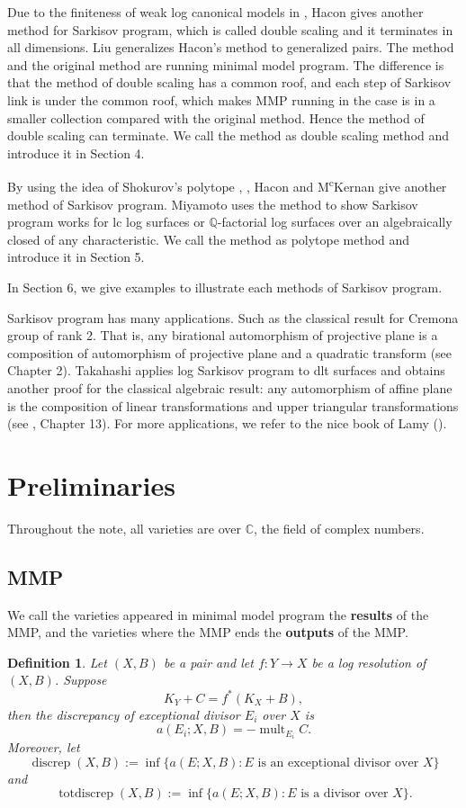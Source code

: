 \documentclass[11pt]{amsart}
\newtheorem{defn}{Definition}[section]
\begin{document}
Due to the finiteness of weak log canonical models in \cite{BCHM10}, Hacon \cite{haconMinimalModelProgram2012} gives another method for Sarkisov program, which is called  double scaling  and it terminates in all dimensions. 
Liu \cite{liuSarkisovProgramGeneralized2021} generalizes Hacon's method to generalized pairs. The method and the original method are running minimal model program. The difference is that the method of double scaling has a common roof, and each step of Sarkisov link is under the common roof, which makes MMP running in the case is in a smaller collection  compared with the original method. Hence the method of double scaling can terminate. We  call the method as double scaling method and introduce it in Section 4.


By using the idea of Shokurov's polytope \cite{Sho96}, \cite{cs11}, Hacon and M\textsuperscript{c}Kernan \cite{haconSarkisovProgram2012} give another method of Sarkisov program. Miyamoto \cite{miyamoto2019TheSP} uses the method to show Sarkisov program works for  lc log surfaces or $\mathbb{Q}$-factorial log surfaces over an algebraically closed of any characteristic.  We call the method as polytope method and introduce it in Section 5.

In Section 6, we give examples to illustrate each methods of Sarkisov program.

Sarkisov program has many applications. Such as the classical result for Cremona group of rank 2. That is, any birational automorphism of projective plane is a composition of automorphism of projective plane and a quadratic transform (see \cite{ksc04} Chapter 2). Takahashi \cite{tak95} applies log Sarkisov program to dlt surfaces and obtains another proof for the classical algebraic result: any automorphism of affine plane is the composition of linear transformations and upper triangular transformations (see \cite{mat02}, Chapter 13). For more applications, we refer to the nice book of Lamy (\cite{lam22}). 


\section{Preliminaries}
Throughout the note, all varieties are over $\mathbb{C}$, the field of complex numbers.
\subsection{MMP}
We call the varieties appeared in minimal model program the \textbf{results} of the MMP, and the varieties where the MMP ends  the \textbf{outputs} of the MMP.
\begin{defn}
  Let $(X,B)$ be a pair  and let  $f:Y\to X$ be a log resolution of $(X,B)$. Suppose
  \[
  K_{Y}+C=f^*(K_{X}+B)
  ,\]
then the discrepancy  of exceptional divisor $E_{i}$ over $X$ is
\[
  a(E_{i};X,B)=-\operatorname{mult}_{E_{i}}C
.\]
 Moreover, let
\[
  \operatorname{discrep}(X, B) := \operatorname{inf}\{a(E; X, B) : E \text{ is an exceptional divisor over } X \}
\]
and
\[
  \operatorname{totdiscrep}(X, B) :=\operatorname{inf}\{a(E; X, B) : E \text{ is a divisor over } X\}.
\]
\end{defn}
\end{document}
